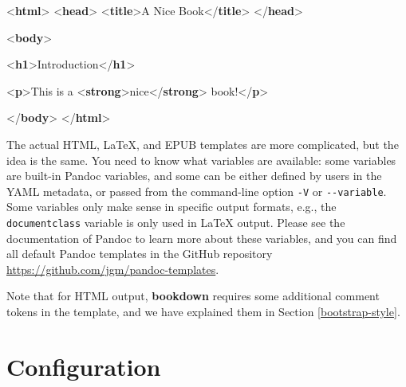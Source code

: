 \documentclass[
  12pt,
]{krantz}
\newenvironment{Shaded}{\begin{snugshade}}{\end{snugshade}}
\newcommand{\DataTypeTok}[1]{\textcolor[rgb]{0.13,0.29,0.53}{#1}}
\newcommand{\KeywordTok}[1]{\textcolor[rgb]{0.13,0.29,0.53}{\textbf{#1}}}
\newcommand{\NormalTok}[1]{#1}
\theoremstyle{definition}
\theoremstyle{definition}
\theoremstyle{definition}
\theoremstyle{definition}
\theoremstyle{remark}
\begin{document}
\begin{Shaded}
\begin{Highlighting}[]
\DataTypeTok{\textless{}}\KeywordTok{html}\DataTypeTok{\textgreater{}}
  \DataTypeTok{\textless{}}\KeywordTok{head}\DataTypeTok{\textgreater{}}
    \DataTypeTok{\textless{}}\KeywordTok{title}\DataTypeTok{\textgreater{}}\NormalTok{A Nice Book}\DataTypeTok{\textless{}/}\KeywordTok{title}\DataTypeTok{\textgreater{}}
  \DataTypeTok{\textless{}/}\KeywordTok{head}\DataTypeTok{\textgreater{}}
  
  \DataTypeTok{\textless{}}\KeywordTok{body}\DataTypeTok{\textgreater{}}
  
  \DataTypeTok{\textless{}}\KeywordTok{h1}\DataTypeTok{\textgreater{}}\NormalTok{Introduction}\DataTypeTok{\textless{}/}\KeywordTok{h1}\DataTypeTok{\textgreater{}}
  
  \DataTypeTok{\textless{}}\KeywordTok{p}\DataTypeTok{\textgreater{}}\NormalTok{This is a }\DataTypeTok{\textless{}}\KeywordTok{strong}\DataTypeTok{\textgreater{}}\NormalTok{nice}\DataTypeTok{\textless{}/}\KeywordTok{strong}\DataTypeTok{\textgreater{}}\NormalTok{ book!}\DataTypeTok{\textless{}/}\KeywordTok{p}\DataTypeTok{\textgreater{}}
  
  \DataTypeTok{\textless{}/}\KeywordTok{body}\DataTypeTok{\textgreater{}}
\DataTypeTok{\textless{}/}\KeywordTok{html}\DataTypeTok{\textgreater{}}
\end{Highlighting}
\end{Shaded}

The actual HTML, LaTeX, and EPUB templates are more complicated, but the idea is the same. You need to know what variables are available: some variables are built-in Pandoc variables, and some can be either defined by users in the YAML metadata, or passed from the command-line option \texttt{-V} or \texttt{-\/-variable}. Some variables only make sense in specific output formats, e.g., the \texttt{documentclass} variable is only used in LaTeX output. Please see the documentation of Pandoc to learn more about these variables, and you can find all default Pandoc templates in the GitHub repository \url{https://github.com/jgm/pandoc-templates}.

Note that for HTML output, \textbf{bookdown} requires some additional comment tokens in the template, and we have explained them in Section \ref{bootstrap-style}.

\section{Configuration}\label{configuration}
\end{document}
